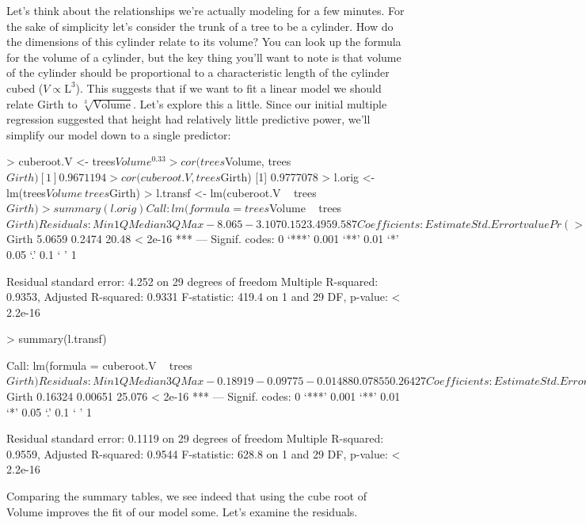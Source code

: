 Let's think about the relationships we're actually modeling for a few minutes.  For the sake of simplicity let's consider the trunk of a tree to be a cylinder.  How do the dimensions of this cylinder relate to its volume? You can look up the formula for the volume of a cylinder, but the key thing you'll want to note is that volume of the cylinder should be proportional to a characteristic length of the cylinder cubed ($V \propto \mathrm{L}^3$). This suggests that if we want to fit a linear model we should relate Girth to $\sqrt[3]{\mathrm{Volume}}$. Let's explore this a little. Since our initial multiple regression suggested that height had relatively little predictive power, we'll simplify our model down to a single predictor:
%
\begin{R}
> cuberoot.V <- trees$Volume^0.33
> cor(trees$Volume, trees$Girth)
[1] 0.9671194
> cor(cuberoot.V, trees$Girth)
[1] 0.9777078
> l.orig <- lm(trees$Volume~ trees$Girth)
> l.transf <- lm(cuberoot.V ~ trees$Girth)
> summary(l.orig)

Call:
lm(formula = trees$Volume ~ trees$Girth)

Residuals:
   Min     1Q Median     3Q    Max
-8.065 -3.107  0.152  3.495  9.587

Coefficients:
            Estimate Std. Error t value Pr(>|t|)
(Intercept) -36.9435     3.3651  -10.98 7.62e-12 ***
trees$Girth   5.0659     0.2474   20.48  < 2e-16 ***
---
Signif. codes:  0 ‘***’ 0.001 ‘**’ 0.01 ‘*’ 0.05 ‘.’ 0.1 ‘ ’ 1

Residual standard error: 4.252 on 29 degrees of freedom
Multiple R-squared: 0.9353, Adjusted R-squared: 0.9331
F-statistic: 419.4 on 1 and 29 DF,  p-value: < 2.2e-16

> summary(l.transf)

Call:
lm(formula = cuberoot.V ~ trees$Girth)

Residuals:
     Min       1Q   Median       3Q      Max
-0.18919 -0.09775 -0.01488  0.07855  0.26427

Coefficients:
            Estimate Std. Error t value Pr(>|t|)
(Intercept)  0.82543    0.08856   9.321 3.18e-10 ***
trees$Girth  0.16324    0.00651  25.076  < 2e-16 ***
---
Signif. codes:  0 ‘***’ 0.001 ‘**’ 0.01 ‘*’ 0.05 ‘.’ 0.1 ‘ ’ 1

Residual standard error: 0.1119 on 29 degrees of freedom
Multiple R-squared: 0.9559, Adjusted R-squared: 0.9544
F-statistic: 628.8 on 1 and 29 DF,  p-value: < 2.2e-16
\end{R}
%
Comparing the summary tables, we see indeed that using the cube root of Volume improves the fit of our model some. Let's examine the residuals.

